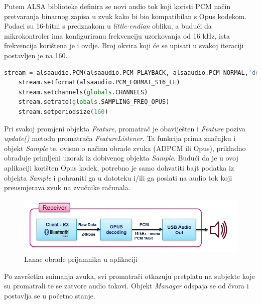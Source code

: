 Putem ALSA biblioteke definira se novi audio tok koji koristi PCM način pretvaranja binarnog zapisa u zvuk kako bi bio kompatibilan s Opus kodekom. Podaci su 16-bitni s predznakom u \textit{little-endian} obliku, a budući da mikrokontroler ima konfiguriranu frekvenciju uzorkovanja od 16 kHz, ista frekvencija korištena je i ovdje. Broj okvira koji će se upisati u svakoj iteraciji postavljen je na 160. 

\begin{lstlisting}[language=Python, caption={Postavljanje parametara za dekodiranje audio signala}]
	stream = alsaaudio.PCM(alsaaudio.PCM_PLAYBACK, alsaaudio.PCM_NORMAL,'default')
	stream.setformat(alsaaudio.PCM_FORMAT_S16_LE)
	stream.setchannels(globals.CHANNELS)
	stream.setrate(globals.SAMPLING_FREQ_OPUS)
	stream.setperiodsize(160)
\end{lstlisting}

Pri svakoj promjeni objekta \textit{Feature}, promatrač je obaviješten i \textit{Feature} poziva \textit{update()} metodu promatrača \textit{FeatureListener}. Ta funkcija prima značajku i objekt \textit{Sample} te, ovisno o načinu obrade zvuka (ADPCM ili Opus), prikladno obrađuje primljeni uzorak iz dobivenog objekta \textit{Sample}. Budući da je u ovoj aplikaciji korišten Opus kodek, potrebno je samo dohvatiti bajt podatka iz objekta \textit{Sample} i pohraniti ga u datoteku i/ili ga poslati na audio tok koji preusmjerava zvuk na zvučnike računala. 

\begin{figure}[ht]
	\includegraphics[width=\linewidth]{imgs/duplex_chain_2}
	\caption{Lanac obrade prijamnika u aplikaciji \cite{fpaudbvlink}}
	\label{fig:duplex_chain_2}
\end{figure}

Po završetku snimanja zvuka, svi promatrači otkazuju pretplatu na subjekte koje su promatrali te se zatvore audio tokovi. Objekt \textit{Manager} odspaja se od čvora i postavlja se u početno stanje.